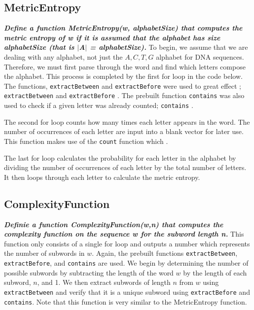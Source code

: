 \documentclass{article}
\begin{document}
\subsection{MetricEntropy}
\textbf{\textit{Define a function MetricEntropy(w, alphabetSize) that computes the metric entropy of w if it is assumed that the alphabet has size alphabetSize (that is $|$A$|$ = alphabetSize).}}
\newline
\newline
To begin, we assume that we are dealing with any alphabet, not just the $A, C, T, G$ alphabet for DNA sequences.
Therefore, we must first parse through the word and find which letters compose the alphabet.
This process is completed by the first for loop in the code below.
The functions, \texttt{extractBetween} and \texttt{extractBefore} were used to great effect \cite{4}; \texttt{extractBetween}  and \texttt{extractBefore} .
The prebuilt function \texttt{contains} was also used to check if a given letter was already counted; \texttt{contains} \cite{4}.

The second for loop counts how many times each letter appears in the word.
The number of occurrences of each letter are input into a blank vector for later use.
This function makes use of the \texttt{count} function which \cite{4}.

The last for loop calculates the probability for each letter in the alphabet by dividing the number of occurrences of each letter by the total number of letters. 
It then loops through each letter to calculate the metric entropy.
\newline


\subsection{ComplexityFunction}
\textbf{\textit{Definie a function ComplexityFunction(w,n) that computes the complexity function on the sequence w for the subword length n.}}
\newline
\newline
This function only consists of a single for loop and outputs a number which represents the number of subwords in $w$.
Again, the prebuilt functions \texttt{extractBetween}, \texttt{extractBefore}, and \texttt{contains} are used.
We begin by determining the number of possible subwords by subtracting the length of the word $w$ by the length of each subword, $n$, and 1.
We then extract subwords of length $n$ from $w$ using \texttt{extractBetween} and verify that it is a unique subword using \texttt{extractBefore} and \texttt{contains}.
Note that this function is very similar to the MetricEntropy function.
\pagebreak

\end{document}
